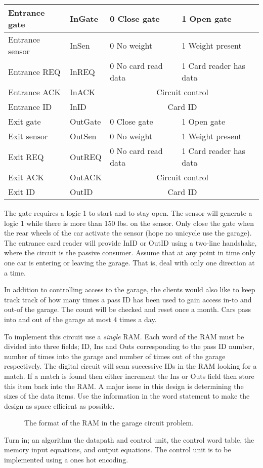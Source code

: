 \begin{enumerate}
\begin{tabular}{|l|l||l|l|} \hline
Entrance gate	& InGate	& 0 Close gate & 1 Open gate \\ \hline
Entrance sensor	& InSen		& 0 No weight &  1 Weight present \\ \hline
Entrance REQ	& InREQ		& 0 No card read data & 1 Card reader has data  \\ \hline
Entrance ACK	& InACK		& \multicolumn{2}{c|}{Circuit control}   \\ \hline
Entrance ID	& InID		& \multicolumn{2}{c|}{Card ID} \\ \hline
Exit gate	& OutGate	& 0 Close gate &  1 Open gate \\ \hline
Exit sensor	& OutSen	& 0 No weight & 1 Weight present\\ \hline
Exit REQ	& OutREQ	& 0 No card read data & 1 Card reader has data  \\ \hline
Exit ACK	& OutACK	& \multicolumn{2}{c|}{Circuit control}   \\ \hline
Exit ID		& OutID		& \multicolumn{2}{c|}{Card ID} \\ \hline
\end{tabular}

The gate requires a logic 1 to start and to stay open. The sensor will 
generate a logic 1 while there is more than 150 lbs. on the sensor.  Only
close the gate when the rear wheels of the car activate the
sensor (hope no unicycle use the garage).  The entrance card reader 
will provide InID or OutID using a 
two-line handshake, where the circuit is the passive consumer.
Assume that at any point in time only one car is
entering or leaving the garage.  That is, deal with only
one direction at a time.

In addition to controlling access to the garage, the clients would also
like to keep track track of how many times a pass ID has been used to
gain access in-to and out-of the garage.  The count will be checked and
reset once a month.  Cars pass into and out of the garage at most 4
times a day.

To implement this circuit use a \textit{ single} RAM.  Each word of the
RAM must be divided into three fields; ID, Ins and Outs corresponding to
the pass ID number, number of times into the garage and number of times
out of the garage respectively.   The digital circuit will scan successive
IDs in the RAM looking for a match.  If a match 
is found then either increment the Ins or Outs field then store this 
item back into the RAM.  A major issue in this design is determining
the sizes of the data items.  Use the information in the word statement
to make the design as space efficient as possible.
\begin{figure}[ht]
\caption{The format of the RAM in the garage circuit problem.}
\label{fig:GarRAM}
\end{figure}
Turn in; an algorithm
the datapath and control unit,
the control word table,
the memory input equations, and
output equations.  
The control unit is to be implemented using a ones hot encoding.


\end{enumerate}
